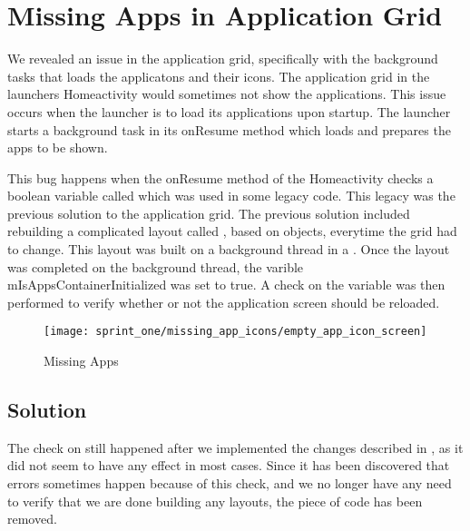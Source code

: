 
\section{Missing Apps in Application Grid}
\label{sec:missing_apps_racecondition}

We revealed an issue in the application grid, specifically with the background tasks that loads the applicatons and their icons. The application grid in the launchers Homeactivity would sometimes not show the applications. This issue occurs when the launcher is to load its applications upon startup. The launcher starts a background task in its onResume method which loads and prepares the apps to be shown.

This bug happens when the onResume method of the Homeactivity checks a boolean variable called  which was used in some legacy code. This legacy was the previous solution to the application grid. The previous solution included rebuilding a complicated layout called , based on  objects, everytime the grid had to change. This layout was built on a background thread in a . Once the layout was completed on the background thread, the varible mIsAppsContainerInitialized was set to true. A check on the variable was then performed to verify whether or not the application screen should be reloaded.

\begin{figure}[!htbp]
    \centering
    \texttt{[image: sprint\_one/missing\_app\_icons/empty\_app\_icon\_screen]}
    \caption{Missing Apps}
    \label{fig:missing_apps}
\end{figure}

\subsection{Solution}
\label{sub:missing_apps_racecondition_solution}

The check on  still happened after we implemented the changes described in , as it did not seem to have any effect in most cases. Since it has been discovered that errors sometimes happen because of this check, and we no longer have any need to verify that we are done building any layouts, the piece of code has been removed. 